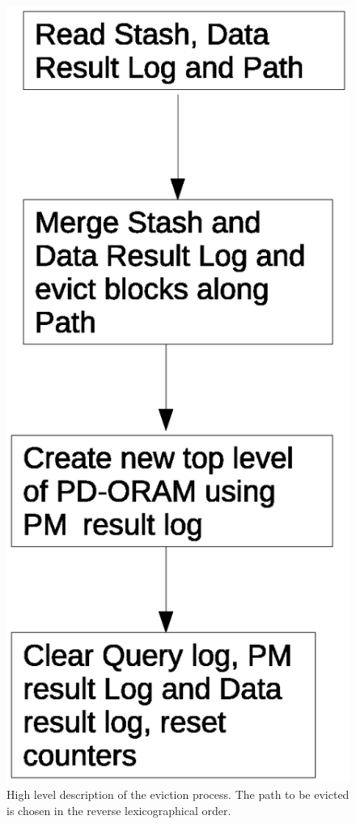 \begin{figure}
 \includegraphics[scale=0.30]{Figures/eviction.eps}
 \vspace{-1cm}
 \caption{High level description of the eviction process. The path to be evicted is chosen in the reverse lexicographical order. \label{eviction_fig}}
\end{figure}


